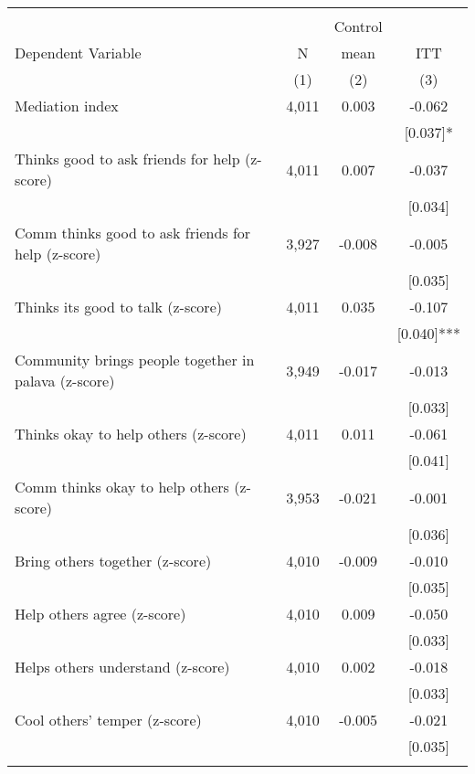 \begin{tabular}{lccc}
\hline \noalign{\smallskip} &  &  & \\
 &  & Control & \\
Dependent Variable & N & mean & ITT\\
 & (1) & (2) & (3)\\
\noalign{\smallskip}\hline \noalign{\smallskip}\quad Mediation index & 4,011 & 0.003 & -0.062\\
 &  &  & [0.037]*\\
\quad Thinks good to ask friends for help (z-score) & 4,011 & 0.007 & -0.037\\
 &  &  & [0.034]\\
\quad Comm thinks good to ask friends for help (z-score) & 3,927 & -0.008 & -0.005\\
 &  &  & [0.035]\\
\quad Thinks its good to talk (z-score) & 4,011 & 0.035 & -0.107\\
 &  &  & [0.040]***\\
\quad Community brings people together in palava (z-score) & 3,949 & -0.017 & -0.013\\
 &  &  & [0.033]\\
\quad Thinks okay to help others (z-score) & 4,011 & 0.011 & -0.061\\
 &  &  & [0.041]\\
\quad Comm thinks okay to help others (z-score) & 3,953 & -0.021 & -0.001\\
 &  &  & [0.036]\\
\quad Bring others together (z-score) & 4,010 & -0.009 & -0.010\\
 &  &  & [0.035]\\
\quad Help others agree (z-score) & 4,010 & 0.009 & -0.050\\
 &  &  & [0.033]\\
\quad Helps others understand (z-score) & 4,010 & 0.002 & -0.018\\
 &  &  & [0.033]\\
\quad Cool others' temper (z-score) & 4,010 & -0.005 & -0.021\\
 &  &  & [0.035]\\
\noalign{\smallskip}\hline\end{tabular}
